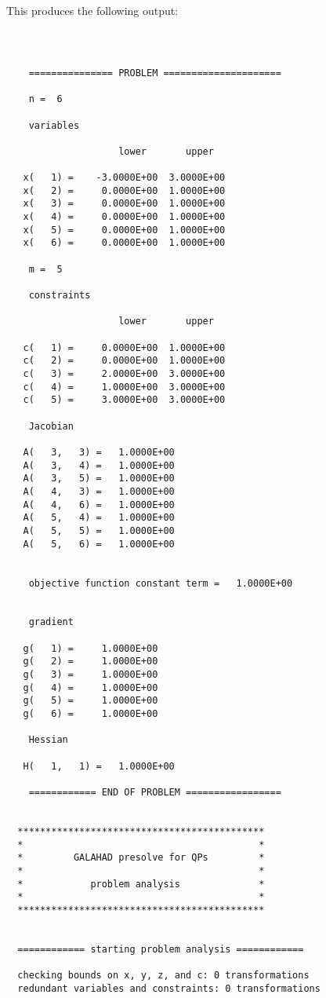 \documentclass{galahad}
\begin{document}
\noindent
This produces the following output:
{\tt \small
\begin{verbatim}

    =============== PROBLEM =====================

    n =  6

    variables

                    lower       upper

   x(   1) =    -3.0000E+00  3.0000E+00
   x(   2) =     0.0000E+00  1.0000E+00
   x(   3) =     0.0000E+00  1.0000E+00
   x(   4) =     0.0000E+00  1.0000E+00
   x(   5) =     0.0000E+00  1.0000E+00
   x(   6) =     0.0000E+00  1.0000E+00

    m =  5

    constraints

                    lower       upper

   c(   1) =     0.0000E+00  1.0000E+00
   c(   2) =     0.0000E+00  1.0000E+00
   c(   3) =     2.0000E+00  3.0000E+00
   c(   4) =     1.0000E+00  3.0000E+00
   c(   5) =     3.0000E+00  3.0000E+00

    Jacobian

   A(   3,   3) =   1.0000E+00
   A(   3,   4) =   1.0000E+00
   A(   3,   5) =   1.0000E+00
   A(   4,   3) =   1.0000E+00
   A(   4,   6) =   1.0000E+00
   A(   5,   4) =   1.0000E+00
   A(   5,   5) =   1.0000E+00
   A(   5,   6) =   1.0000E+00


    objective function constant term =   1.0000E+00


    gradient

   g(   1) =     1.0000E+00
   g(   2) =     1.0000E+00
   g(   3) =     1.0000E+00
   g(   4) =     1.0000E+00
   g(   5) =     1.0000E+00
   g(   6) =     1.0000E+00

    Hessian

   H(   1,   1) =   1.0000E+00

    ============ END OF PROBLEM =================


  ********************************************
  *                                          *
  *         GALAHAD presolve for QPs         *
  *                                          *
  *            problem analysis              *
  *                                          *
  ********************************************


  ============ starting problem analysis ============

  checking bounds on x, y, z, and c: 0 transformations
  redundant variables and constraints: 0 transformations


\end{verbatim}}
\end{document}

